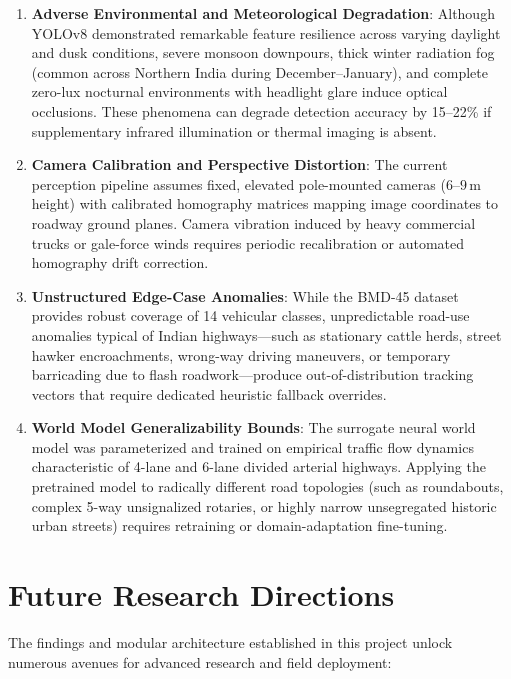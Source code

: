 \begin{enumerate}
    \item \textbf{Adverse Environmental and Meteorological Degradation}: Although YOLOv8 demonstrated remarkable feature resilience across varying daylight and dusk conditions, severe monsoon downpours, thick winter radiation fog (common across Northern India during December--January), and complete zero-lux nocturnal environments with headlight glare induce optical occlusions. These phenomena can degrade detection accuracy by 15--22\% if supplementary infrared illumination or thermal imaging is absent.
    
    \item \textbf{Camera Calibration and Perspective Distortion}: The current perception pipeline assumes fixed, elevated pole-mounted cameras ($6\text{--}9$\,m height) with calibrated homography matrices mapping image coordinates to roadway ground planes. Camera vibration induced by heavy commercial trucks or gale-force winds requires periodic recalibration or automated homography drift correction.
    
    \item \textbf{Unstructured Edge-Case Anomalies}: While the BMD-45 dataset provides robust coverage of 14 vehicular classes, unpredictable road-use anomalies typical of Indian highways—such as stationary cattle herds, street hawker encroachments, wrong-way driving maneuvers, or temporary barricading due to flash roadwork—produce out-of-distribution tracking vectors that require dedicated heuristic fallback overrides.
    
    \item \textbf{World Model Generalizability Bounds}: The surrogate neural world model was parameterized and trained on empirical traffic flow dynamics characteristic of 4-lane and 6-lane divided arterial highways. Applying the pretrained model to radically different road topologies (such as roundabouts, complex 5-way unsignalized rotaries, or highly narrow unsegregated historic urban streets) requires retraining or domain-adaptation fine-tuning.
\end{enumerate}

\section{Future Research Directions}
\label{sec:future_work}
The findings and modular architecture established in this project unlock numerous avenues for advanced research and field deployment:

